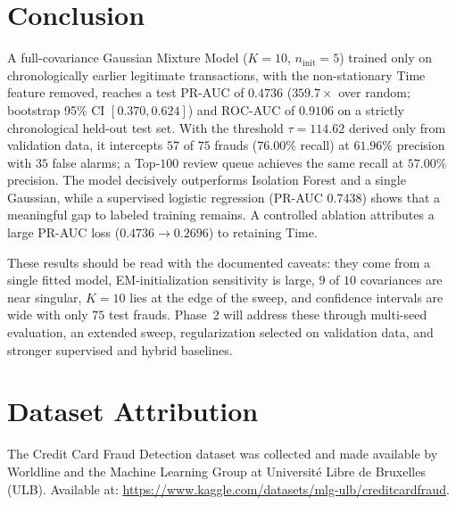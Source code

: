 \documentclass[conference]{IEEEtran}
\begin{document}
\section{Conclusion}

A full-covariance Gaussian Mixture Model ($K=10$, $n_{\text{init}}=5$) trained only on chronologically earlier legitimate transactions, with the non-stationary $\text{Time}$ feature removed, reaches a test PR-AUC of $0.4736$ ($359.7\times$ over random; bootstrap 95\% CI $[0.370, 0.624]$) and ROC-AUC of $0.9106$ on a strictly chronological held-out test set. With the threshold $\tau = 114.62$ derived only from validation data, it intercepts $57$ of $75$ frauds ($76.00\%$ recall) at $61.96\%$ precision with $35$ false alarms; a Top-$100$ review queue achieves the same recall at $57.00\%$ precision. The model decisively outperforms Isolation Forest and a single Gaussian, while a supervised logistic regression (PR-AUC $0.7438$) shows that a meaningful gap to labeled training remains. A controlled ablation attributes a large PR-AUC loss ($0.4736 \to 0.2696$) to retaining $\text{Time}$.

These results should be read with the documented caveats: they come from a single fitted model, EM-initialization sensitivity is large, $9$ of $10$ covariances are near singular, $K=10$ lies at the edge of the sweep, and confidence intervals are wide with only $75$ test frauds. Phase~2 will address these through multi-seed evaluation, an extended sweep, regularization selected on validation data, and stronger supervised and hybrid baselines.

\section*{Dataset Attribution}
The Credit Card Fraud Detection dataset was collected and made available by Worldline and the Machine Learning Group at Universit\'e Libre de Bruxelles (ULB). Available at: \url{https://www.kaggle.com/datasets/mlg-ulb/creditcardfraud}.
\end{document}
